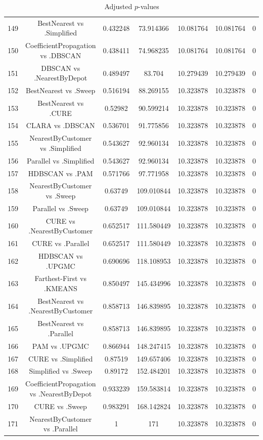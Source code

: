 \documentclass[a4paper,10pt]{article}
\begin{document}
\begin{landscape}
\begin{table}[!htp]
\begin{tabular}{ccccccc}
149&BestNearest vs .Simplified&0.432248&73.914366&10.081764&10.081764&0\\
150&CoefficientPropagation vs .DBSCAN&0.438411&74.968235&10.081764&10.081764&0\\
151&DBSCAN vs .NearestByDepot&0.489497&83.704&10.279439&10.279439&0\\
152&BestNearest vs .Sweep&0.516194&88.269155&10.323878&10.323878&0\\
153&BestNearest vs .CURE&0.52982&90.599214&10.323878&10.323878&0\\
154&CLARA vs .DBSCAN&0.536701&91.775856&10.323878&10.323878&0\\
155&NearestByCustomer vs .Simplified&0.543627&92.960134&10.323878&10.323878&0\\
156&Parallel vs .Simplified&0.543627&92.960134&10.323878&10.323878&0\\
157&HDBSCAN vs .PAM&0.571766&97.771958&10.323878&10.323878&0\\
158&NearestByCustomer vs .Sweep&0.63749&109.010844&10.323878&10.323878&0\\
159&Parallel vs .Sweep&0.63749&109.010844&10.323878&10.323878&0\\
160&CURE vs .NearestByCustomer&0.652517&111.580449&10.323878&10.323878&0\\
161&CURE vs .Parallel&0.652517&111.580449&10.323878&10.323878&0\\
162&HDBSCAN vs .UPGMC&0.690696&118.108953&10.323878&10.323878&0\\
163&Farthest-First vs .KMEANS&0.850497&145.434996&10.323878&10.323878&0\\
164&BestNearest vs .NearestByCustomer&0.858713&146.839895&10.323878&10.323878&0\\
165&BestNearest vs .Parallel&0.858713&146.839895&10.323878&10.323878&0\\
166&PAM vs .UPGMC&0.866944&148.247415&10.323878&10.323878&0\\
167&CURE vs .Simplified&0.87519&149.657406&10.323878&10.323878&0\\
168&Simplified vs .Sweep&0.89172&152.484201&10.323878&10.323878&0\\
169&CoefficientPropagation vs .NearestByDepot&0.933239&159.583814&10.323878&10.323878&0\\
170&CURE vs .Sweep&0.983291&168.142824&10.323878&10.323878&0\\
171&NearestByCustomer vs .Parallel&1&171&10.323878&10.323878&0\\
\hline
\end{tabular}
\caption{Adjusted $p$-values}
\end{table}

\end{landscape}
\end{document}
